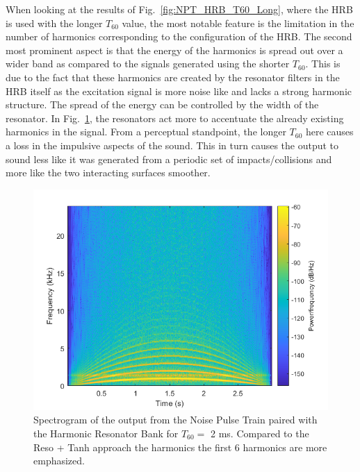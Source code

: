 \documentclass[../main.tex]{subfiles}
\begin{document}
When looking at the results of Fig.~\ref{fig:NPT_HRB_T60_Long}, where the HRB is used with the longer $T_{60}$ value, the most notable feature is the limitation in the number of harmonics corresponding to the configuration of the HRB. The second most prominent aspect is that the energy of the harmonics is spread out over a wider band as compared to the signals generated using the shorter $T_{60}$. This is due to the fact that these harmonics are created by the resonator filters in the HRB itself as the excitation signal is more noise like and lacks a strong harmonic structure. The spread of the energy can be controlled by the width of the resonator. In Fig.~\ref{fig:NPT_HRB_T60_Short}, the resonators act more to accentuate the already existing harmonics in the signal. From a perceptual standpoint, the longer $T_{60}$ here causes a loss in the impulsive aspects of the sound. This in turn causes the output to sound less like it was generated from a periodic set of impacts/collisions and more like the two interacting surfaces smoother.

\begin{figure}[h]
    \centering
    \includegraphics[scale=.65]{./images/plots/NPTHRBT60Short.png}
    \caption{Spectrogram of the output from the Noise Pulse Train paired with the Harmonic Resonator Bank for $T_{60} = $ 2 ms. Compared to the Reso + Tanh approach the harmonics the first 6 harmonics are more emphasized.}
    \label{fig:NPT_HRB_T60_Short}
\end{figure}
\end{document}
